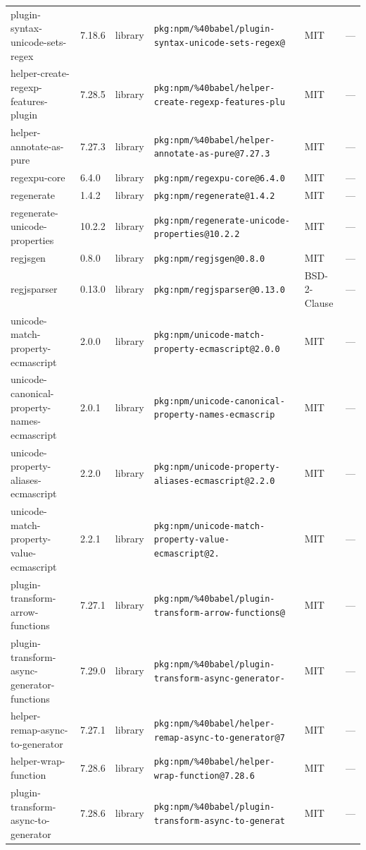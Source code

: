 \documentclass[11pt]{article}
\begin{document}
\begin{longtable}{|l|l|l|p{2.2cm}|l|p{4cm}|}
plugin-syntax-unicode-sets-regex & 7.18.6 & library & \texttt{pkg:npm/\%40babel/plugin-syntax-unicode-sets-regex@} & MIT & — \\
helper-create-regexp-features-plugin & 7.28.5 & library & \texttt{pkg:npm/\%40babel/helper-create-regexp-features-plu} & MIT & — \\
helper-annotate-as-pure & 7.27.3 & library & \texttt{pkg:npm/\%40babel/helper-annotate-as-pure@7.27.3} & MIT & — \\
regexpu-core & 6.4.0 & library & \texttt{pkg:npm/regexpu-core@6.4.0} & MIT & — \\
regenerate & 1.4.2 & library & \texttt{pkg:npm/regenerate@1.4.2} & MIT & — \\
regenerate-unicode-properties & 10.2.2 & library & \texttt{pkg:npm/regenerate-unicode-properties@10.2.2} & MIT & — \\
regjsgen & 0.8.0 & library & \texttt{pkg:npm/regjsgen@0.8.0} & MIT & — \\
regjsparser & 0.13.0 & library & \texttt{pkg:npm/regjsparser@0.13.0} & BSD-2-Clause & — \\
unicode-match-property-ecmascript & 2.0.0 & library & \texttt{pkg:npm/unicode-match-property-ecmascript@2.0.0} & MIT & — \\
unicode-canonical-property-names-ecmascript & 2.0.1 & library & \texttt{pkg:npm/unicode-canonical-property-names-ecmascrip} & MIT & — \\
unicode-property-aliases-ecmascript & 2.2.0 & library & \texttt{pkg:npm/unicode-property-aliases-ecmascript@2.2.0} & MIT & — \\
unicode-match-property-value-ecmascript & 2.2.1 & library & \texttt{pkg:npm/unicode-match-property-value-ecmascript@2.} & MIT & — \\
plugin-transform-arrow-functions & 7.27.1 & library & \texttt{pkg:npm/\%40babel/plugin-transform-arrow-functions@} & MIT & — \\
plugin-transform-async-generator-functions & 7.29.0 & library & \texttt{pkg:npm/\%40babel/plugin-transform-async-generator-} & MIT & — \\
helper-remap-async-to-generator & 7.27.1 & library & \texttt{pkg:npm/\%40babel/helper-remap-async-to-generator@7} & MIT & — \\
helper-wrap-function & 7.28.6 & library & \texttt{pkg:npm/\%40babel/helper-wrap-function@7.28.6} & MIT & — \\
plugin-transform-async-to-generator & 7.28.6 & library & \texttt{pkg:npm/\%40babel/plugin-transform-async-to-generat} & MIT & — \\

\end{longtable}
\end{document}
